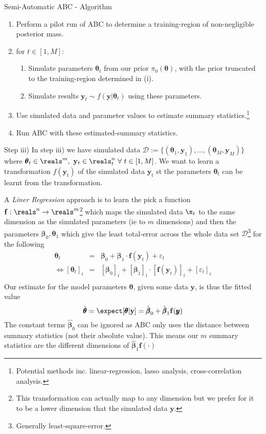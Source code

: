\documentclass[11pt,a4paper]{article}
\begin{document}
  \begin{proposition}{Semi-Automatic ABC - Algorithm}
    \begin{enumerate}
      \item Perform a pilot run of ABC to determine a training-region of non-negligible posterior mass.
      \item for $t\in[1,M]$:
      \begin{enumerate}
        \item Simulate parameters $\pmb\theta_t$ from our prior $\pi_0(\pmb\theta)$, with the prior truncated to the training-region determined in (i).
        \item Simulate results $\mathbf{y}_t\sim f(\mathbf{y}|\pmb\theta_t)$ using these parameters.
      \end{enumerate}
      \item Use simulated data and parameter values to estimate summary statistics.\footnote{Potential methods inc. linear-regression, lasso analysis, cross-correlation analysis.}
      \item Run ABC with these estimated-summary statistics.
    \end{enumerate}
  \end{proposition}

  \begin{remark}{Step iii)}
    In step iii) we have simulated data $\mathcal{D}:=\{(\pmb\theta_1,\mathbf{y}_1),\dots,(\pmb\theta_M,\mathbf{y}_M)\}$ where $\pmb\theta_t\in\reals^m,\ \mathbf{y}_t\in\reals_t^n\ \forall\ t\in[1,M]$. We want to learn a transformation $f(\mathbf{y}_t)$ of the simulated data $\mathbf{y}_t$ st the parameters $\pmb\theta_t$ can be learnt from the transformation.
    \par A \textit{Liner Regression} approach is to learn the pick a function $\mathbf{f}:\reals^n\to\reals^m$\footnote{This transformation can actually map to any dimension but we prefer for it to be a lower dimension that the simulated data $\mathbf{y}$.} which maps the simulated data $\x_t$ to the same dimension as the simulated parameters (ie to $m$ dimensions) and then the parameters $\pmb\beta_0,\pmb\theta_1$ which give the least total-error across the whole data set $\mathcal{D}$\footnote{Generally least-square-error.} for the following
    \[\begin{array}{rcl}
      \pmb\theta_t&=&\pmb\beta_0+\pmb\beta_1\cdot \mathbf{f}(\mathbf{y}_t)+\varepsilon_t\\
      \Leftrightarrow[\pmb\theta_t]_i&=&[\pmb\beta_0]_i+[\pmb\beta_1]_i\cdot[\mathbf{f}(\mathbf{y}_t)]_i+[\varepsilon_t]_i\\
    \end{array}\]
    Our estimate for the model parameters $\pmb\theta$, given some data $\mathbf{y}$, is thus the fitted value
    \[ \hat{\pmb\theta}=\expect[\pmb\theta|\mathbf{y}]=\hat{\pmb\beta}_0+\hat{\pmb\beta}_1 \mathbf{f}(\pmb{y}) \]
    The constant terms $\hat{\pmb\beta}_0$ can be ignored as ABC only uses the distance between summary statistics (not their absolute value). This means our $m$ summary statistics are the different dimensions of $\hat{\pmb\beta}_1\mathbf{f}(\cdot)$
  \end{remark}
\end{document}
